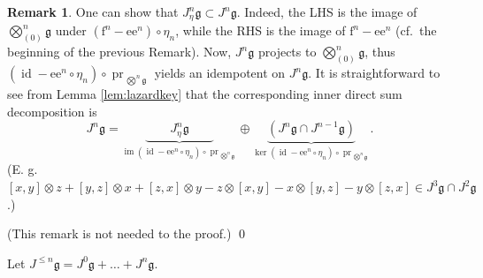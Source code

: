 \documentclass[11pt,a4paper]{amsart}
\newcommand{\plabel}[1]{ \label{#1}}
\newcommand{\plabel}[1]{ \label{#1}\rlap{\smash{${}^{^{[#1]}}$}}}
\newenvironment{commentx}{\color{magenta} }{\color{black} }
\newcommand{\plabel}[1]{ \label{#1}}
\DeclareMathOperator{\im}{im}
\DeclareMathOperator{\proj}{pr}
\DeclareMathOperator{\id}{id}
\newcommand{\botimes}{{\textstyle\bigotimes}}
\theoremstyle{definition}
\newtheorem{remark}[point]{Remark}
\theoremstyle{plain}
\newcommand{\qedremark}{  \renewcommand{\qedsymbol}{$\triangle$} \qed \renewcommand{\qedsymbol}{$\Box$}}
\begin{document}
\begin{commentx}
\begin{remark}\plabel{rem:split}
One can show that $J_{\eta}^n\mathfrak g\subset J^n\mathfrak g$.
Indeed, the LHS is  the image of $\botimes^n_{(0)}\mathfrak g$ under   $(\mathrm f^n-\mathrm e\mathrm e^n)\circ\eta_n$,
while the RHS is the image of $\mathrm f^n-\mathrm e\mathrm e^n$ (cf.~the beginning of the previous Remark).
Now, $J^n\mathfrak g$ projects to $\botimes^n_{(0)}\mathfrak g$,
thus $(\id- \mathrm e\mathrm e^{n}\circ\eta_n)\circ\proj_{\,\bigotimes^n\mathfrak g}$ yields an idempotent on
$J^n\mathfrak g$.
It is straightforward  to see from Lemma \ref{lem:lazardkey} that the corresponding inner direct sum decomposition is
\[J^n\mathfrak g=\underbrace{\qquad J^n_\eta\mathfrak g \qquad}_{\im (\id- \mathrm e\mathrm e^{n}\circ\eta_n)\circ\proj_{\,\bigotimes^n\mathfrak g}}
\oplus \underbrace{(J^n\mathfrak g\cap  J^{n-1}\mathfrak g)}_{\ker (\id- \mathrm e\mathrm e^{n}\circ\eta_n)\circ\proj_{\,\bigotimes^n\mathfrak g}}.\]
(E. g. $[x,y]\otimes z+[y,z]\otimes x+[z,x]\otimes y-z\otimes[x,y]-x\otimes[y,z]-y\otimes[z,x]\in J^3\mathfrak g\cap J^2\mathfrak g$.)

(This remark is not needed to the proof.)
\qedremark
\end{remark}
\end{commentx}

Let $J^{\leq n}\mathfrak g=J^{0}\mathfrak g+\ldots+J^{n}\mathfrak g$.
\end{document}
